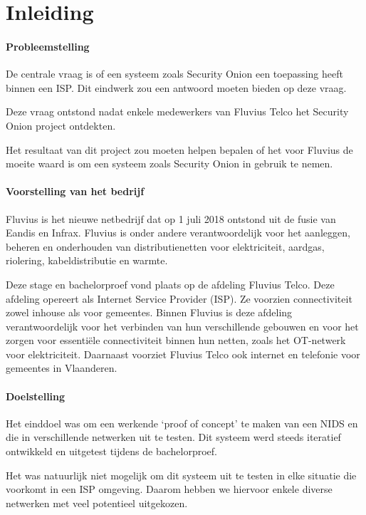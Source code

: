 \documentclass[a4paper,12pt]{report}
\begin{document}
\listoffigures

\chapter*{Inleiding}
\subsubsection{Probleemstelling}
De centrale vraag is of een systeem zoals Security Onion een toepassing heeft binnen een ISP.
Dit eindwerk zou een antwoord moeten bieden op deze vraag.

Deze vraag ontstond nadat enkele medewerkers van Fluvius Telco het Security Onion project ontdekten.

Het resultaat van dit project zou moeten helpen bepalen of het voor Fluvius de moeite waard is om een systeem zoals Security Onion in gebruik te nemen.

\subsubsection{Voorstelling van het bedrijf}
Fluvius is het nieuwe netbedrijf dat op 1 juli 2018 ontstond uit de fusie van Eandis en Infrax.
Fluvius is onder andere verantwoordelijk voor het aanleggen, beheren en onderhouden van distributienetten voor elektriciteit, aardgas, riolering, kabeldistributie en warmte.

Deze stage en bachelorproef vond plaats op de afdeling Fluvius Telco.
Deze afdeling opereert als Internet Service Provider (ISP).
Ze voorzien connectiviteit zowel inhouse als voor gemeentes.
Binnen Fluvius is deze afdeling verantwoordelijk voor het verbinden van hun verschillende gebouwen en voor het zorgen voor essentiële connectiviteit binnen hun netten, zoals het OT-netwerk voor elektriciteit.
Daarnaast voorziet Fluvius Telco ook internet en telefonie voor gemeentes in Vlaanderen.

\subsubsection{Doelstelling}
Het einddoel was om een werkende `proof of concept' te maken van een NIDS en die in verschillende netwerken uit te testen.
Dit systeem werd steeds iteratief ontwikkeld en uitgetest tijdens de bachelorproef.

Het was natuurlijk niet mogelijk om dit systeem uit te testen in elke situatie die voorkomt in een ISP omgeving.
Daarom hebben we hiervoor enkele diverse netwerken met veel potentieel uitgekozen.
\end{document}
